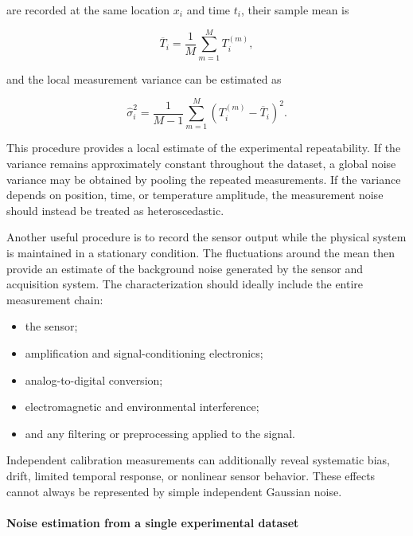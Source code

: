 are recorded at the same location $x_i$ and time $t_i$, their sample mean is

\begin{equation}
\overline{T}_i
=
\frac{1}{M}
\sum_{m=1}^{M}
T_i^{(m)},
\end{equation}

and the local measurement variance can be estimated as

\begin{equation}
\widehat{\sigma}_i^2
=
\frac{1}{M-1}
\sum_{m=1}^{M}
\left(
T_i^{(m)}-\overline{T}_i
\right)^2.
\end{equation}

This procedure provides a local estimate of the experimental repeatability. If
the variance remains approximately constant throughout the dataset, a global
noise variance may be obtained by pooling the repeated measurements. If the
variance depends on position, time, or temperature amplitude, the measurement
noise should instead be treated as heteroscedastic.

Another useful procedure is to record the sensor output while the physical
system is maintained in a stationary condition. The fluctuations around the
mean then provide an estimate of the background noise generated by the sensor
and acquisition system. The characterization should ideally include the entire
measurement chain:

\begin{itemize}
    \item the sensor;
    \item amplification and signal-conditioning electronics;
    \item analog-to-digital conversion;
    \item electromagnetic and environmental interference;
    \item and any filtering or preprocessing applied to the signal.
\end{itemize}

Independent calibration measurements can additionally reveal systematic bias,
drift, limited temporal response, or nonlinear sensor behavior. These effects
cannot always be represented by simple independent Gaussian noise.

\paragraph{Noise estimation from a single experimental dataset}

